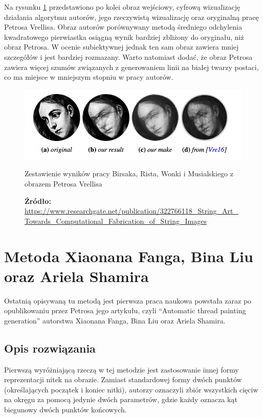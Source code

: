 \documentclass[a4paper, 12pt, polish, twoside]{extreport}
\begin{document}
        Na rysunku \ref{others-birsak-output} przedstawiono po kolei obraz wejściowy, cyfrową wizualizację działania algorytmu autorów, jego rzeczywistą wizualizację oraz oryginalną pracę Petrosa Vrellisa. Obraz autorów porównywany metodą średniego odchylenia kwadratowego pierwiastka osiągną wynik bardziej zbliżony do oryginału, niż obraz Petrosa. W ocenie subiektywnej jednak ten sam obraz zawiera mniej szczegółów i jest bardziej rozmazany. Warto natomiast dodać, że obraz Petrosa zawiera więcej szumów związanych z generowaniem linii na białej twarzy postaci, co ma miejsce w mniejszym stopniu w pracy autorów.
        \begin{figure}[H]
            \centering
            \includegraphics[width=\textwidth,keepaspectratio]{img/3-others/birsak-vs-petros.png}
            \caption{Zestawienie wyników pracy Birsaka, Rista, Wonki i Musialskiego z obrazem Petrosa Vrellisa}
            \caption*{\footnotesize{\textbf{Źródło:} {\url{https://www.researchgate.net/publication/322766118_String_Art_Towards_Computational_Fabrication_of_String_Images}}}}
            \label{others-birsak-output}
        \end{figure}

    \section{Metoda Xiaonana Fanga, Bina Liu oraz Ariela Shamira} \label{others-xiao}
    Ostatnią opisywaną tu metodą jest pierwsza praca naukowa powstała zaraz po opublikowaniu przez Petrosa jego artykułu, czyli ``Automatic thread painting generation'' autorstwa Xiaonana Fanga, Bina Liu oraz Ariela Shamira.
    
        \subsection{Opis rozwiązania}
        Pierwszą wyróżniającą rzeczą w tej metodzie jest zastosowanie innej formy reprezentacji nitek na obrazie. Zamiast standardowej formy dwóch punktów (określających początek i koniec nitki), autorzy oznaczyli zbiór wszystkich cięciw na okręgu za pomocą jedynie dwóch parametrów, gdzie każdy oznacza kąt biegunowy dwóch punktów końcowych.
        
\end{document}
